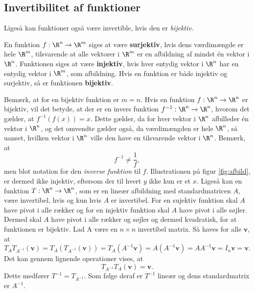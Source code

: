 %
%
\subsection{Invertibilitet af funktioner}
%
% 
Ligeså kan funktioner også være invertible, hvis den er \textit{bijektiv}.
%
\begin{defn}{}{}
En funktion $f:\R^n \rightarrow \R^m$ siges at være \textbf{surjektiv}, hvis dens værdimængde er hele $\R^m$, tilsvarende at alle vektorer i $\R^m$ er en afbildning af mindst én vektor i $\R^n$.
Funktionen siges at være \textbf{injektiv}, hvis hver entydig vektor i $\R^n$ har en entydig vektor i $\R^m$, som afbildning.
Hvis en funktion er både injektiv og surjektiv, så er funktionen \textbf{bijektiv}.
\end{defn}
\noindent
%
Bemærk, at for en bijektiv funktion er $m=n$.
Hvis en funktion $f:\R^n \rightarrow \R^n$ er bijektiv, vil det betyde, at der er en invers funktion $f^{-1}:\R^n \rightarrow \R^n$, hvorom det gælder, at $f^{-1}(f(x))=x$.
Dette gælder, da for hver vektor i $\R^n$ afbilleder én vektor i $\R^n$, og det omvendte gælder også, da værdimængden er hele $\R^n$, så uanset, hvilken vektor i $\R^n$ ville den have en tilsvarende vektor i $\R^n$.
Bemærk, at
$$f^{-1} \neq \frac{1}{f},$$
men blot notation for den \textit{inverse funktion} til $f$.
%
Illustrationen på figur \ref{fig:afbild}, er dermed ikke injektiv, eftersom der til hvert $y$ ikke kun er et $x$. 
%
Ligeså kan en funktion $T:\R^n \rightarrow \R^n$, som er en lineær afbildning med standardmatricen $A$, være invertibel, hvis og kun hvis $A$ er invertibel. 
For en sujektiv funktion skal $A$ have pivot i alle rækker og for en injektiv funktion skal $A$ have pivot i alle søjler.
Dermed skal $A$ have pivot i alle rækker og søjler og dermed kvadratisk, for at funktionen er bijektiv.
Lad A være en $n \times n$ invertibel matrix. 
Så haves for alle $\textbf{v}$, at
$$T_AT_{A^{-1}}(\textbf{v})=T_A(T_{A^{-1}}(\textbf{v}))=T_A(A^{-1}\textbf{v})=A(A^{-1}\textbf{v})=AA^{-1}\textbf{v}=I_n\textbf{v}=\textbf{v}.$$
Det kan gennem lignende operationer vises, at
$$T_{A^{-1}}T_A(\textbf{v})=\textbf{v}.$$
%
Dette medfører $T^{-1}=T_{A^{-1}}$. 
Som følge deraf er $T^{-1}$ lineær og dens standardmatrix er $A^{-1}$.
\\
%
